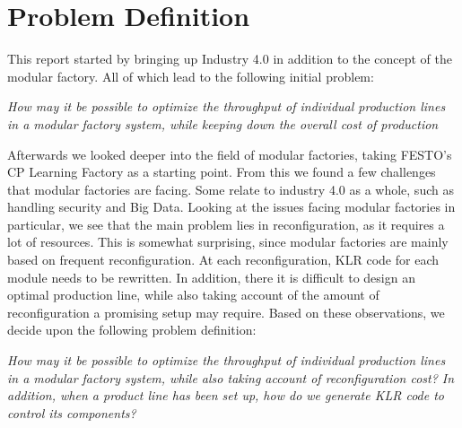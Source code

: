 \section{Problem Definition}\label{ch:problemdefinition}
This report started by bringing up Industry 4.0 in addition to the concept of the modular factory. All of which lead to the following initial problem:

\bigskip
\textit{How may it be possible to optimize the throughput of individual production lines in a modular factory system, while keeping down the overall cost of production}
\bigskip

Afterwards we looked deeper into the field of modular factories, taking FESTO's CP Learning Factory as a starting point. From this we found a few challenges that modular factories are facing. Some relate to industry 4.0 as a whole, such as handling security and Big Data. Looking at the issues facing modular factories in particular, we see that the main problem lies in reconfiguration, as it requires a lot of resources. This is somewhat surprising, since modular factories are mainly based on frequent reconfiguration. At each reconfiguration, KLR code for each module needs to be rewritten. In addition, there it is difficult to design an optimal production line, while also taking account of the amount of reconfiguration a promising setup may require. Based on these observations, we decide upon the following problem definition:     

\bigskip
\textit{How may it be possible to optimize the throughput of individual production lines in a modular factory system, while also taking account of reconfiguration cost? In addition, when a product line has been set up, how do we generate KLR code to control its components?}
\bigskip





